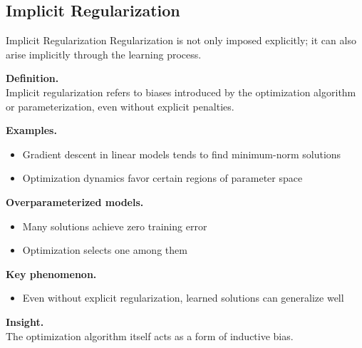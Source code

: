 \documentclass[aspectratio=169,11pt]{beamer}
\begin{document}
\subsection{Implicit Regularization}
\begin{frame}[t,allowframebreaks]{Implicit Regularization}
\small
Regularization is not only imposed explicitly; it can also arise implicitly through the learning process.

\textbf{Definition.}\\ Implicit regularization refers to biases introduced by the optimization algorithm or parameterization, even without explicit penalties.

\textbf{Examples.}\\ \begin{itemize}
    \item Gradient descent in linear models tends to find minimum-norm solutions
    \item Optimization dynamics favor certain regions of parameter space
\end{itemize}

\textbf{Overparameterized models.}\\ \begin{itemize}
    \item Many solutions achieve zero training error
    \item Optimization selects one among them
\end{itemize}

\textbf{Key phenomenon.}\\ \begin{itemize}
    \item Even without explicit regularization, learned solutions can generalize well
\end{itemize}

\textbf{Insight.}\\ The optimization algorithm itself acts as a form of inductive bias.
\end{frame}
\end{document}
